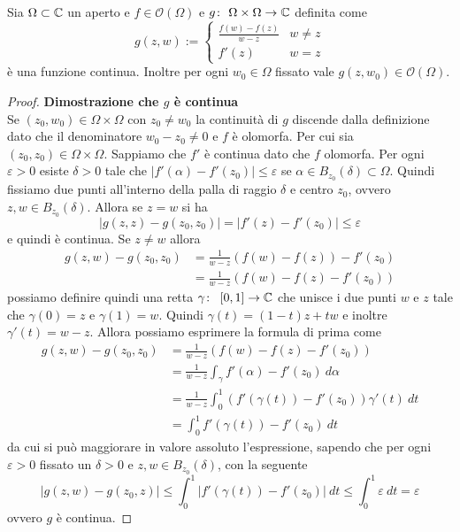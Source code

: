  \begin{lemma}
   Sia $\Omega \subset \mathbb{C}$ un aperto e $f \in \mathcal{O}(\Omega)$
   e $g \colon\ \Omega\times\Omega \rightarrow \mathbb{C}$ definita come 
   \begin{equation*}
     g(z,w) :=
     \begin{cases}
       \frac{f(w) - f(z)}{w-z} & w \neq z \\
       f'(z)                   & w = z
     \end{cases}
   \end{equation*}
   è una funzione continua. Inoltre per ogni $w_0 \in \Omega$ fissato vale
   $g(z,w_0) \in \mathcal{O}(\Omega)$.
   \label{lem:rapporto-incrementale-funzione-olomorfa}
 \end{lemma}
 \begin{proof}
    \textbf{Dimostrazione che $g$ è continua} \\
    
    Se $(z_0, w_0) \in \Omega\times\Omega$ con $z_0 \neq w_0$ la
    continuità di $g$ discende dalla definizione dato che il denominatore
    $w_0 - z_0 \neq 0$ e $f$ è olomorfa. 
    Per cui sia $(z_0, z_0) \in \Omega \times \Omega$. Sappiamo che $f'$
    è continua dato che $f$ olomorfa. Per ogni $\varepsilon > 0$ esiste $\delta
    >0$ tale che $|f'(\alpha) - f'(z_0)| \le \varepsilon$ se $\alpha \in
    B_{z_0}(\delta) \subset \Omega$. Quindi fissiamo due punti all'interno
    della palla di raggio $\delta$ e centro $z_0$, ovvero $z,w \in
    B_{z_0}(\delta)$. Allora se $z = w$ si ha 
    \begin{equation*}
      |g(z,z) - g(z_0,z_0)| = |f'(z) - f'(z_0)| \le \varepsilon
    \end{equation*}
    e quindi è continua. Se $z \neq w$ allora
    \begin{align*}
    g(z,w) - g(z_0, z_0) & = \frac{1}{w-z}(f(w) - f(z)) - f'(z_0) \\
    & = \frac{1}{w-z}(f(w)- f(z) - f'(z_0)) 
    \end{align*}
    possiamo definire quindi una retta $\gamma \colon\ \left[0,1
    \right] \rightarrow \mathbb{C}$ che unisce i due punti $w$ e $z$ tale che 
    $\gamma(0) = z$ e $\gamma(1) = w$. Quindi $\gamma(t) = (1-t)z+ tw$
    e inoltre $\gamma'(t) = w - z$. Allora possiamo esprimere la formula di
    prima come
    \begin{align*}
       g(z,w) - g(z_0, z_0) & = \frac{1}{w-z}(f(w)- f(z) - f'(z_0)) \\
        & = \frac{1}{w-z} \int_\gamma f'(\alpha) - f'(z_0)\ d\alpha \\
        & = \frac{1}{w-z} \int^1_0 (f'(\gamma(t)) - f'(z_0)) \gamma'(t)\
        dt \\
        & = \int^1_0 f'(\gamma(t)) - f'(z_0)\ dt
    \end{align*}
    da cui si può maggiorare in valore assoluto l'espressione, sapendo
    che per ogni $\varepsilon > 0$ fissato un $\delta >0$ e $z,w \in
    B_{z_0}(\delta)$, con la seguente
    \begin{equation*}
      |g(z,w) - g(z_0,z)| \le \int^1_0 |f'(\gamma(t)) - f'(z_0)|\ dt \le
      \int^1_0 \varepsilon\ dt = \varepsilon
    \end{equation*}
    ovvero $g$ è continua.


\end{proof}
